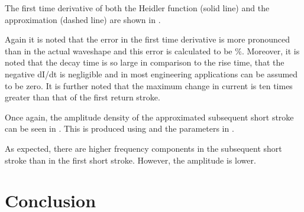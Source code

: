 The first time derivative of both the Heidler function (solid line) and the approximation (dashed line) are shown in .

Again it is noted that the error in the first time derivative is more pronounced than in the actual waveshape and this error is calculated to be \unskip \%. Moreover, it is noted that the decay time is so large in comparison to the rise time, that the negative dI/dt is negligible and in most engineering applications can be assumed to be zero. It is further noted that the maximum change in current is ten times greater than that of the first return stroke.

Once again, the amplitude density of the approximated subsequent short stroke can be seen in . This is produced using  and the parameters in .

As expected, there are higher frequency components in the subsequent short stroke than in the first short stroke. However, the amplitude is lower.


\section{Conclusion}
\label{sec:results_conclusion}
